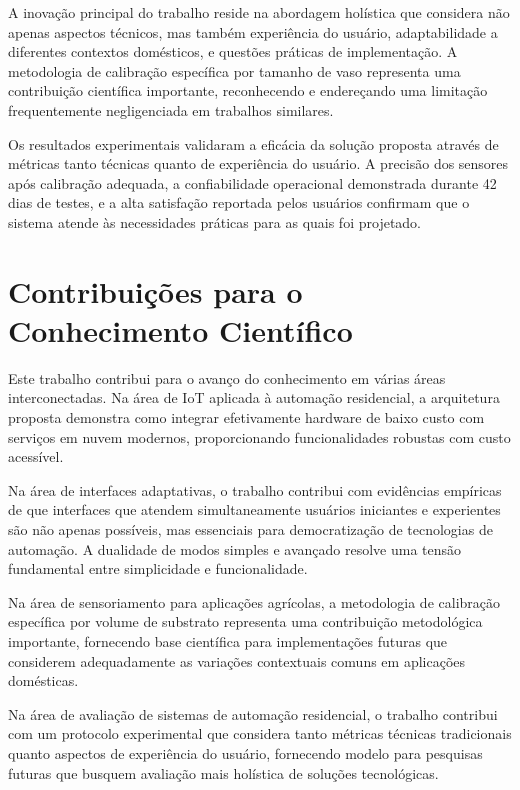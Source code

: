 A inovação principal do trabalho reside na abordagem holística que considera não apenas aspectos técnicos, mas também experiência do usuário, adaptabilidade a diferentes contextos domésticos, e questões práticas de implementação. A metodologia de calibração específica por tamanho de vaso representa uma contribuição científica importante, reconhecendo e endereçando uma limitação frequentemente negligenciada em trabalhos similares.

Os resultados experimentais validaram a eficácia da solução proposta através de métricas tanto técnicas quanto de experiência do usuário. A precisão dos sensores após calibração adequada, a confiabilidade operacional demonstrada durante 42 dias de testes, e a alta satisfação reportada pelos usuários confirmam que o sistema atende às necessidades práticas para as quais foi projetado.

\section{Contribuições para o Conhecimento Científico}

Este trabalho contribui para o avanço do conhecimento em várias áreas interconectadas. Na área de IoT aplicada à automação residencial, a arquitetura proposta demonstra como integrar efetivamente hardware de baixo custo com serviços em nuvem modernos, proporcionando funcionalidades robustas com custo acessível.

Na área de interfaces adaptativas, o trabalho contribui com evidências empíricas de que interfaces que atendem simultaneamente usuários iniciantes e experientes são não apenas possíveis, mas essenciais para democratização de tecnologias de automação. A dualidade de modos simples e avançado resolve uma tensão fundamental entre simplicidade e funcionalidade.

Na área de sensoriamento para aplicações agrícolas, a metodologia de calibração específica por volume de substrato representa uma contribuição metodológica importante, fornecendo base científica para implementações futuras que considerem adequadamente as variações contextuais comuns em aplicações domésticas.

Na área de avaliação de sistemas de automação residencial, o trabalho contribui com um protocolo experimental que considera tanto métricas técnicas tradicionais quanto aspectos de experiência do usuário, fornecendo modelo para pesquisas futuras que busquem avaliação mais holística de soluções tecnológicas.

